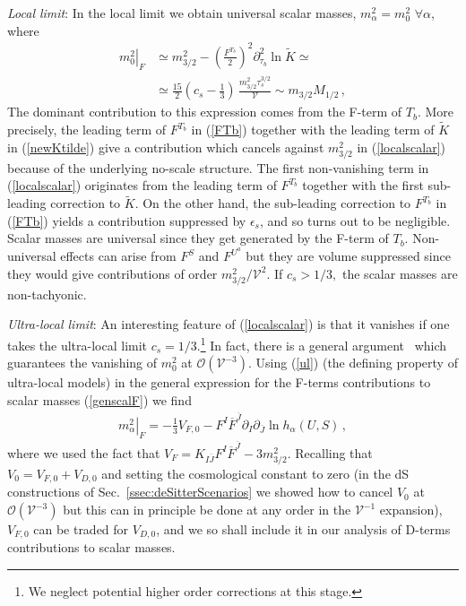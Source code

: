 \documentclass[12pt,a4paper]{book}
\def\nn{\nonumber}
\def\nn{\nonumber}
\newcommand\vo{{\mathcal{V}}}
\newcommand{\mc}{\mathcal}
\begin{document}
\emph{Local limit}: In the local limit we obtain universal scalar masses, $m_\alpha^2=m_0^2$ $\forall \alpha$, where
\begin{align}
\left.m_0^2\right|_F &\simeq m_{3/2}^2 - \left(\frac{F^{T_b}}{2}\right)^2 \partial^2_{\tau_b} \ln\tilde{K}
\simeq \nn \\
&\simeq \frac{15}{2}\left(c_s-\frac{1}{3}\right)\, \frac{m_{3/2}^2 \tau_s^{3/2}}{\vo}\sim m_{3/2} M_{1/2}\,,
\label{localscalar}
\end{align}
The dominant contribution to this expression comes from the F-term of $T_b$. More precisely, the leading term of $F^{T_b}$ in (\ref{FTb}) together with the leading term of $\tilde{K}$ in (\ref{newKtilde}) give a contribution which cancels against $m_{3/2}^2$ in (\ref{localscalar}) because of the underlying no-scale structure. The first non-vanishing term in (\ref{localscalar}) originates from the leading term of $F^{T_b}$
together with the first sub-leading correction to $\tilde{K}$. On the other hand, the sub-leading correction to $F^{T_b}$ in (\ref{FTb}) yields a contribution suppressed by $\epsilon_s$, and so turns out to be negligible.\\

Scalar masses are universal since they get generated by the F-term of $T_b$. Non-universal effects can arise from $F^S$ and $F^{U^a}$ but they are volume suppressed since they would give contributions of order $m_{3/2}^2/\mathcal{V}^2$. If $c_s>1/3,$ the scalar masses are non-tachyonic.

\medskip
\emph{Ultra-local limit}: An interesting feature of (\ref{localscalar}) is that it vanishes if one takes the ultra-local limit $c_s= 1/3$.\footnote{We neglect potential higher order corrections at this stage.} In fact, there is a general argument~\cite{Blumenhagen:2009gk} which guarantees the vanishing of $m_0^2$ at $\mc{O}(\mathcal{V}^{-3})$. Using (\ref{ul}) (the defining property of ultra-local models) in the general expression for the F-terms contributions to scalar masses (\ref{genscalF}) we find
\begin{align}
\left.m_\alpha^2\right|_F = - \frac 13 V_{F,0} - F^I \overline{F}^{\overline{J}} \partial_I \partial_{\overline{J}} \ln h_\alpha(U,S)\,,
\label{ulsm2}
\end{align}
where we used the fact that $V_F= K_{I\overline{J}}F^I \overline{F}^{\overline{J}}- 3 m_{3/2}^2$. Recalling that $V_0 = V_{F,0} + V_{D,0}$ and setting the cosmological constant to zero (in the dS constructions of Sec.~\ref{ssec:deSitterScenarios} we showed how to cancel $V_0$ at $\mc{O}(\mathcal{V}^{-3})$ but this can in principle be done at any order in the $\mathcal{V}^{-1}$ expansion), $V_{F,0}$ can be traded for $V_{D,0}$,
and we so shall include it in our analysis of D-terms contributions to scalar masses.\\
\end{document}
